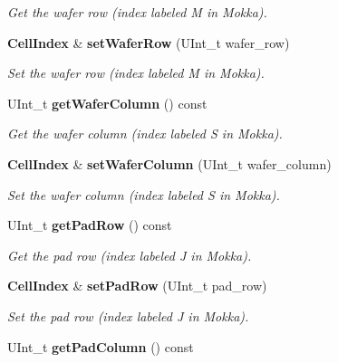 \begin{DoxyCompactItemize}
\begin{DoxyCompactList}\small\item\em Get the wafer row (index labeled M in Mokka). \item\end{DoxyCompactList}\item 
{\bf CellIndex} \& {\bf setWaferRow} (UInt\_\-t wafer\_\-row)\label{classCALICE_1_1CellIndex_a4a3c7537dd7b4077e5463ae08c4c14f0}

\begin{DoxyCompactList}\small\item\em Set the wafer row (index labeled M in Mokka). \item\end{DoxyCompactList}\item 
UInt\_\-t {\bf getWaferColumn} () const \label{classCALICE_1_1CellIndex_a5b0755196e562f4230eb58aa820b5018}

\begin{DoxyCompactList}\small\item\em Get the wafer column (index labeled S in Mokka). \item\end{DoxyCompactList}\item 
{\bf CellIndex} \& {\bf setWaferColumn} (UInt\_\-t wafer\_\-column)\label{classCALICE_1_1CellIndex_a9680833ddfa0e1137ddc4e4945ecca58}

\begin{DoxyCompactList}\small\item\em Set the wafer column (index labeled S in Mokka). \item\end{DoxyCompactList}\item 
UInt\_\-t {\bf getPadRow} () const \label{classCALICE_1_1CellIndex_aeecbb345a8d7a8215d020ee2ad5a73c3}

\begin{DoxyCompactList}\small\item\em Get the pad row (index labeled J in Mokka). \item\end{DoxyCompactList}\item 
{\bf CellIndex} \& {\bf setPadRow} (UInt\_\-t pad\_\-row)\label{classCALICE_1_1CellIndex_a8e4528b241353e1ae52eb7febecdb371}

\begin{DoxyCompactList}\small\item\em Set the pad row (index labeled J in Mokka). \item\end{DoxyCompactList}\item 
UInt\_\-t {\bf getPadColumn} () const \label{classCALICE_1_1CellIndex_a37471316b7ce32ad1b19f9dc08444193}


\end{DoxyCompactItemize}
